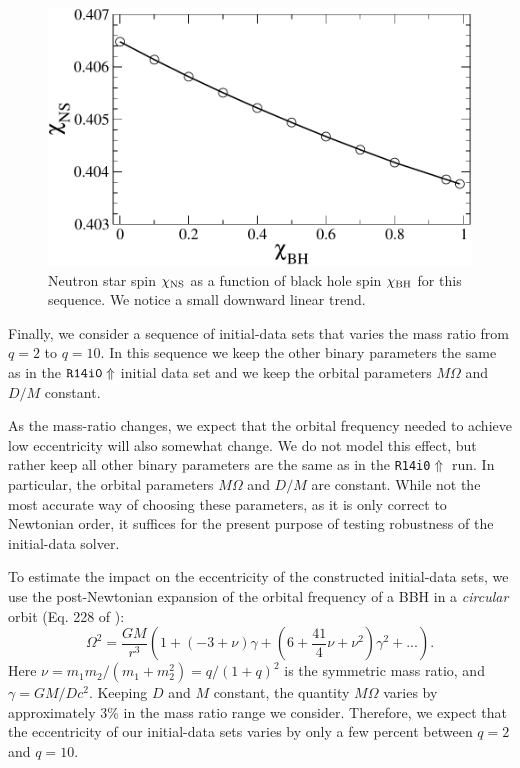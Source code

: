 \begin{figure}
\centerline{\includegraphics[scale=0.95]{chap4/chichi}}
\caption[Measured neutron star spin plotted as a function of black
  hole spin.]{\label{fig:chichi}Neutron star spin $\chi_{\rm NS}$ as a
  function of black hole spin $\chi_{\rm BH}$ for this sequence. We
  notice a small downward linear trend.}
\end{figure}



Finally, we consider a sequence of initial-data sets that varies the
mass ratio from $q=2$ to $q=10$. In this sequence we keep the other
binary parameters the same as in the ${\tt R14i0\Uparrow}$ initial
data set and we keep the orbital parameters $M\Omega$ and $D/M$
constant.

As the mass-ratio changes, we expect that the orbital frequency needed
to achieve low eccentricity will also somewhat change. We do not
model this effect, but rather keep all other binary parameters are the
same as in the {\tt R14i0$\Uparrow$} run. In particular, the orbital
parameters $M\Omega$ and $D/M$ are constant. While not the most
accurate way of choosing these parameters, as it is only correct to
Newtonian order, it suffices for the present purpose of testing
robustness of the initial-data solver.

To estimate the impact on the eccentricity of the constructed
initial-data sets, we use the post-Newtonian expansion of the orbital
frequency of a BBH in a {\it circular} orbit (Eq. 228 of
\cite{Blanchet2006}):
\begin{equation}
\Omega^2=\frac{GM}{r^3}\left(1+(-3+\nu)\gamma+\left(6+\frac{41}{4}\nu+\nu^2\right)\gamma^2+...\right).
\end{equation}
Here $\nu=m_1m_2/(m_1+m_2^2)=q/(1+q)^2$ is the symmetric mass ratio, and
$\gamma=GM/Dc^2$. Keeping $D$ and $M$ constant, the quantity $M\Omega$
varies by approximately 3\% in the mass ratio range we consider.
Therefore, we expect that the eccentricity of our initial-data sets varies
by only a few percent between $q=2$ and $q=10$.


